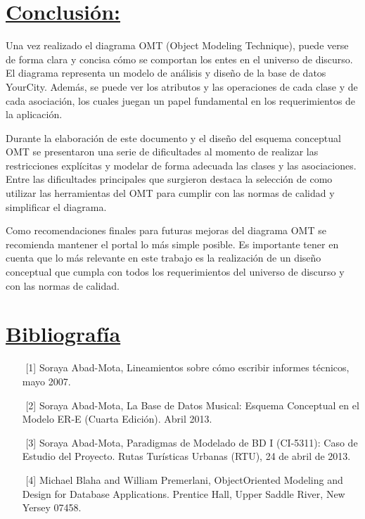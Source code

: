 \documentclass[a4paper]{article}
\begin{document}
\section{\underline{Conclusión:} }





\hspace{0,4 cm} Una vez realizado el diagrama OMT (Object Modeling Technique), puede verse de forma clara y concisa cómo se comportan los entes en el universo de discurso. El diagrama representa un modelo de análisis y diseño de la base de datos YourCity. Además, se puede ver los atributos y las operaciones de cada clase y de cada asociación, los cuales juegan un papel fundamental en los requerimientos de la aplicación.

\hspace{0,4 cm} Durante la elaboración de este documento y el diseño del esquema conceptual OMT se presentaron una serie de dificultades al momento de realizar las restricciones explícitas y modelar de forma adecuada las clases y las asociaciones. Entre las dificultades principales que surgieron destaca la selección de como utilizar las herramientas del OMT para cumplir con las normas de calidad y simplificar el diagrama.


\hspace{0,4 cm}Como recomendaciones finales para futuras mejoras del diagrama OMT se recomienda mantener el portal lo más simple posible. Es importante tener en cuenta que lo más relevante en este trabajo es la realización de un diseño conceptual que cumpla con todos los requerimientos del universo de discurso y con las normas de calidad.





\vspace{10 cm}

\section{\underline{Bibliografía}}


\begin{itemize}
\item[$$] [1]  Soraya Abad-Mota, Lineamientos sobre cómo escribir informes técnicos, mayo 2007. 
\item[$$] [2] Soraya Abad-Mota, La Base de Datos Musical: Esquema Conceptual en el Modelo ER-E (Cuarta Edición). Abril 2013.
\item[$$][3] Soraya Abad-Mota, Paradigmas de Modelado de BD I (CI-5311): Caso de Estudio del Proyecto. Rutas Turísticas Urbanas (RTU), 24 de abril de 2013.
\item[$$][4] Michael Blaha and William Premerlani, Object­Oriented Modeling and Design for Database Applications. Prentice Hall, Upper Saddle River, New Yersey 07458. 
\end{itemize}
\end{document}
